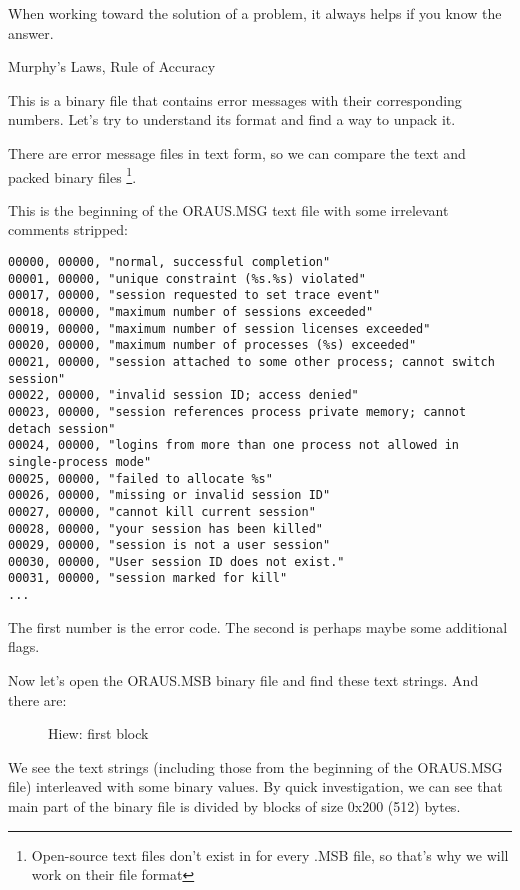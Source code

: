 ﻿
\myindex{\oracle}
\epigraph{When working toward the solution of a problem, it always helps if you know the answer.}{Murphy's Laws, Rule of Accuracy}

This is a binary file that contains error messages with their corresponding numbers.
Let's try to understand 
its format and find a way to unpack it.

There are \oracle error message files in text form, 
so we can compare the text and packed binary files
\footnote{Open-source text files don't exist in \oracle for every .MSB file, so that's why we will work on their file format}.

This is the beginning of the ORAUS.MSG text file with some irrelevant comments stripped:

\begin{lstlisting}[caption=Beginning of ORAUS.MSG file without comments]
00000, 00000, "normal, successful completion"
00001, 00000, "unique constraint (%s.%s) violated"
00017, 00000, "session requested to set trace event"
00018, 00000, "maximum number of sessions exceeded"
00019, 00000, "maximum number of session licenses exceeded"
00020, 00000, "maximum number of processes (%s) exceeded"
00021, 00000, "session attached to some other process; cannot switch session"
00022, 00000, "invalid session ID; access denied"
00023, 00000, "session references process private memory; cannot detach session"
00024, 00000, "logins from more than one process not allowed in single-process mode"
00025, 00000, "failed to allocate %s"
00026, 00000, "missing or invalid session ID"
00027, 00000, "cannot kill current session"
00028, 00000, "your session has been killed"
00029, 00000, "session is not a user session"
00030, 00000, "User session ID does not exist."
00031, 00000, "session marked for kill"
...
\end{lstlisting}

The first number is the error code.
The second is perhaps maybe some additional flags.

\clearpage
Now let's open the ORAUS.MSB 
binary file and find these text strings. 
And there are:

\begin{figure}[H]
\centering
{}
\caption{Hiew: first block}
\label{fig:oracle_MSB_1}
\end{figure}

We see the text strings (including those from the beginning of the ORAUS.MSG file) 
interleaved with some binary values.
By quick investigation, we can see that main part of the binary file is divided by blocks of 
size 0x200 (512) bytes.

